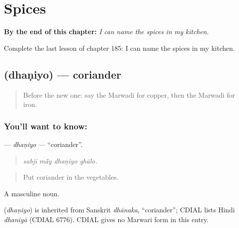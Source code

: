 
\chapter{Spices}
\label{ch:mw-spices}

\begin{chapteropening}
\textbf{By the end of this chapter:} \emph{I can name the spices in my kitchen.}

Complete the last lesson of chapter 185: I can name the spices in my kitchen.
\end{chapteropening}

\section[\texorpdfstring{\mw{धणियो} (dhaṇiyo)}{धणियो (dhaṇiyo)}]{ (dhaṇiyo) — coriander}

\label{lesson:MW-C185-dhaniyo}



\begin{quote}
Before the new one: say the Marwadi for copper, then the Marwadi for iron.
\end{quote}

\subsection*{You'll want to know: }
\textbf{} — \emph{dhaṇiyo} — \textquotedblleft{}coriander\textquotedblright{}.

\begin{quote}
   
\end{quote}

\begin{quote}
\emph{sabjī mā̃y dhaṇiyo ghālo.}
\end{quote}

\begin{quote}
Put coriander in the vegetables.
\end{quote}

A masculine noun.

\begin{cousinweb}
\textbf{} (\emph{dhaṇiyo}) is inherited from Sanskrit \emph{dhānaka}, \textquotedblleft{}coriander\textquotedblright{}; CDIAL lists Hindi \emph{dhaniyā} (CDIAL 6776). CDIAL gives no Marwari form in this entry.
\end{cousinweb}

